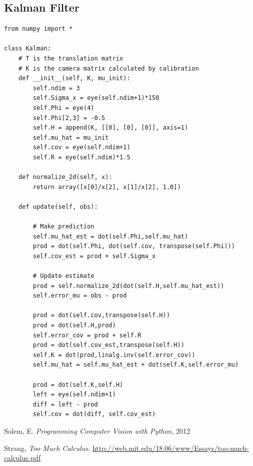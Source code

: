 \documentclass{article}
\begin{document}
\subsection{Kalman Filter}

\begin{verbatim}
from numpy import *

class Kalman:
    # T is the translation matrix
    # K is the camera matrix calculated by calibration
    def __init__(self, K, mu_init):
        self.ndim = 3
        self.Sigma_x = eye(self.ndim+1)*150
        self.Phi = eye(4)
        self.Phi[2,3] = -0.5
        self.H = append(K, [[0], [0], [0]], axis=1)
        self.mu_hat = mu_init
        self.cov = eye(self.ndim+1)
        self.R = eye(self.ndim)*1.5
        
    def normalize_2d(self, x): 
        return array([x[0]/x[2], x[1]/x[2], 1.0])
    
    def update(self, obs):

        # Make prediction
        self.mu_hat_est = dot(self.Phi,self.mu_hat) 
        prod = dot(self.Phi, dot(self.cov, transpose(self.Phi)))
        self.cov_est = prod + self.Sigma_x
                
        # Update estimate
        prod = self.normalize_2d(dot(self.H,self.mu_hat_est))
        self.error_mu = obs - prod
        
        prod = dot(self.cov,transpose(self.H))
        prod = dot(self.H,prod)
        self.error_cov = prod + self.R
        prod = dot(self.cov_est,transpose(self.H))
        self.K = dot(prod,linalg.inv(self.error_cov))
        self.mu_hat = self.mu_hat_est + dot(self.K,self.error_mu)
        
        prod = dot(self.K,self.H)
        left = eye(self.ndim+1) 
        diff = left - prod
        self.cov = dot(diff, self.cov_est)
\end{verbatim}

  

\begin{thebibliography}{1}

Solem, E. \emph{Programming Computer Vision with Python}, 2012

Strang, \emph{Too Much Calculus}, \url{http://web.mit.edu/18.06/www/Essays/too-much-calculus.pdf}

\end{thebibliography}
\end{document}
